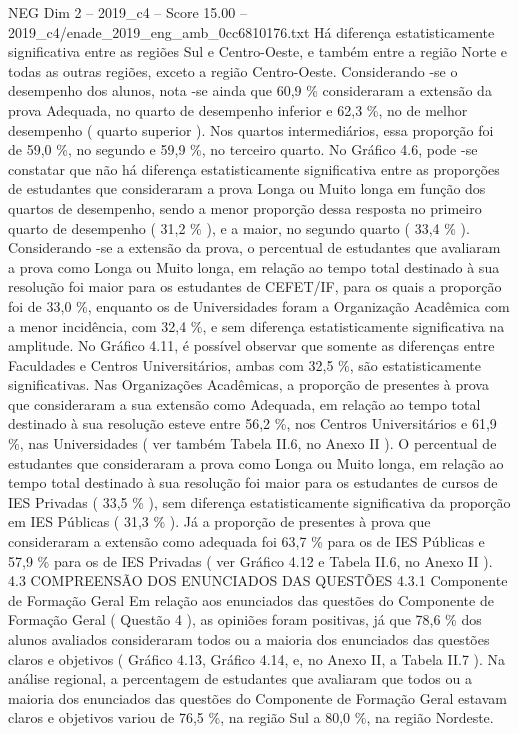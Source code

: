 \begin{textsample}{NEG Dim 2 – 2019\_c4 – Score 15.00 – 2019\_c4/enade\_2019\_eng\_amb\_0cc6810176.txt}
Há diferença estatisticamente significativa entre as regiões Sul e Centro-Oeste, e também entre a região Norte e todas as outras regiões, exceto a região Centro-Oeste.
Considerando -se o desempenho dos alunos, nota -se ainda que 60,9 \% consideraram a extensão da prova Adequada, no quarto de desempenho inferior e 62,3 \%, no de melhor desempenho ( quarto superior ).
Nos quartos intermediários, essa proporção foi de 59,0 \%, no segundo e 59,9 \%, no terceiro quarto.
No Gráfico 4.6, pode -se constatar que não há diferença estatisticamente significativa entre as proporções de estudantes que consideraram a prova Longa ou Muito longa em função dos quartos de desempenho, sendo a menor proporção dessa resposta no primeiro quarto de desempenho ( 31,2 \% ), e a maior, no segundo quarto ( 33,4 \% ).
Considerando -se a extensão da prova, o percentual de estudantes que avaliaram a prova como Longa ou Muito longa, em relação ao tempo total destinado à sua resolução foi maior para os estudantes de CEFET/IF, para os quais a proporção foi de 33,0 \%, enquanto os de Universidades foram a Organização Acadêmica com a menor incidência, com 32,4 \%, e sem diferença estatisticamente significativa na amplitude.
No Gráfico 4.11, é possível observar que somente as diferenças entre Faculdades e Centros Universitários, ambas com 32,5 \%, são estatisticamente significativas.
Nas Organizações Acadêmicas, a proporção de presentes à prova que consideraram a sua extensão como Adequada, em relação ao tempo total destinado à sua resolução esteve entre 56,2 \%, nos Centros Universitários e 61,9 \%, nas Universidades ( ver também Tabela II.6, no Anexo II ).
O percentual de estudantes que consideraram a prova como Longa ou Muito longa, em relação ao tempo total destinado à sua resolução foi maior para os estudantes de cursos de IES Privadas ( 33,5 \% ), sem diferença estatisticamente significativa da proporção em IES Públicas ( 31,3 \% ).
Já a proporção de presentes à prova que consideraram a extensão como adequada foi 63,7 \% para os de IES Públicas e 57,9 \% para os de IES Privadas ( ver Gráfico 4.12 e Tabela II.6, no Anexo II ). 4.3 COMPREENSÃO DOS ENUNCIADOS DAS QUESTÕES 4.3.1 Componente de Formação Geral Em relação aos enunciados das questões do Componente de Formação Geral ( Questão 4 ), as opiniões foram positivas, já que 78,6 \% dos alunos avaliados consideraram todos ou a maioria dos enunciados das questões claros e objetivos ( Gráfico 4.13, Gráfico 4.14, e, no Anexo II, a Tabela II.7 ).
Na análise regional, a percentagem de estudantes que avaliaram que todos ou a maioria dos enunciados das questões do Componente de Formação Geral estavam claros e objetivos variou de 76,5 \%, na região Sul a 80,0 \%, na região Nordeste.

\end{textsample}
